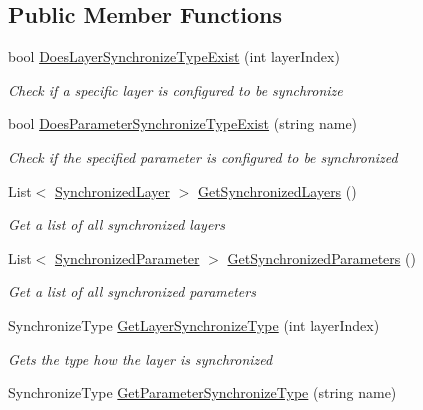 \subsection*{Public Member Functions}
\begin{DoxyCompactItemize}
\item 
bool \hyperlink{class_photon_animator_view_adc769a9e9d902955529aa36fd7f94c77}{Does\+Layer\+Synchronize\+Type\+Exist} (int layer\+Index)
\begin{DoxyCompactList}\small\item\em Check if a specific layer is configured to be synchronize \end{DoxyCompactList}\item 
bool \hyperlink{class_photon_animator_view_a58c3ae7da3a1217062dd6f510c69e5a8}{Does\+Parameter\+Synchronize\+Type\+Exist} (string name)
\begin{DoxyCompactList}\small\item\em Check if the specified parameter is configured to be synchronized \end{DoxyCompactList}\item 
List$<$ \hyperlink{class_photon_animator_view_1_1_synchronized_layer}{Synchronized\+Layer} $>$ \hyperlink{class_photon_animator_view_a5cd222a56cf3364aea3fa1d2641383ed}{Get\+Synchronized\+Layers} ()
\begin{DoxyCompactList}\small\item\em Get a list of all synchronized layers \end{DoxyCompactList}\item 
List$<$ \hyperlink{class_photon_animator_view_1_1_synchronized_parameter}{Synchronized\+Parameter} $>$ \hyperlink{class_photon_animator_view_a03c466f84479ffeb0509324adfa27c5b}{Get\+Synchronized\+Parameters} ()
\begin{DoxyCompactList}\small\item\em Get a list of all synchronized parameters \end{DoxyCompactList}\item 
Synchronize\+Type \hyperlink{class_photon_animator_view_aca2599e3520233dd0a92550d2fef3781}{Get\+Layer\+Synchronize\+Type} (int layer\+Index)
\begin{DoxyCompactList}\small\item\em Gets the type how the layer is synchronized \end{DoxyCompactList}\item 
Synchronize\+Type \hyperlink{class_photon_animator_view_ab5c89d5d60a51fdd97b883f85d27a10f}{Get\+Parameter\+Synchronize\+Type} (string name)

\end{DoxyCompactItemize}
